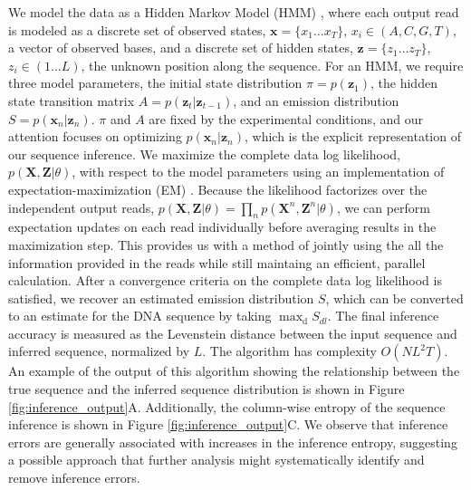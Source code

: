 \documentclass{biophys_letter}
\begin{document}
We model the data as a Hidden Markov Model (HMM) \cite{Rabiner:1989}, where each output read is modeled as a discrete set of observed states, $\mathbf{x}=\{x_{1}\dots x_{T}\}$, $x_i \in (A,C,G,T)$, a vector of observed bases, and a discrete set of hidden states, $\mathbf{z}=\{z_{1} \dots z_{T}\}$, $z_i \in (1 \dots L)$, the unknown position along the sequence.
For an HMM, we require three model parameters, the initial state distribution $\pi=p(\mathbf{z}_{1})$, the hidden state transition matrix $A=p(\mathbf{z}_{t}|\mathbf{z}_{t-1})$, and an emission distribution $S=p(\mathbf{x}_{n}|\mathbf{z}_{n})$. 
$\pi$ and $A$ are fixed by the experimental conditions, and our attention focuses on optimizing $p(\mathbf{x}_{n}|\mathbf{z}_{n})$, which is the explicit representation of our sequence inference.
We maximize the complete data log likelihood, $p(\mathbf{X},\mathbf{Z}|\theta)$, with respect to the model parameters using an implementation of expectation-maximization (EM) \cite{Baum:1970}.
Because the likelihood factorizes over the independent output reads, $p(\mathbf{X},\mathbf{Z}|\theta)=\prod_{n}p(\mathbf{X}^n,\mathbf{Z}^n|\theta)$, we can perform expectation updates on each read individually before averaging results in the maximization step.
This provides us with a method of jointly using the all the information provided in the reads while still maintaing an efficient, parallel calculation.
After a convergence criteria on the complete data log likelihood is satisfied, we recover an estimated emission distribution $S$, which can be converted to an estimate for the DNA sequence by taking $\mathrm{\max_{d}} {S_{dl}}$.
The final inference accuracy is measured as the Levenstein distance between the input sequence and inferred sequence, normalized by $L$.
The algorithm has complexity $O(NL^{2}T)$.
An example of the output of this algorithm showing the relationship between the true sequence and the inferred sequence distribution is shown in Figure \ref{fig:inference_output}A.
Additionally, the column-wise entropy of the sequence inference is shown in Figure \ref{fig:inference_output}C.
We observe that inference errors are generally associated with increases in the inference entropy, suggesting a possible approach that further analysis might systematically identify and remove inference errors.
\end{document}
